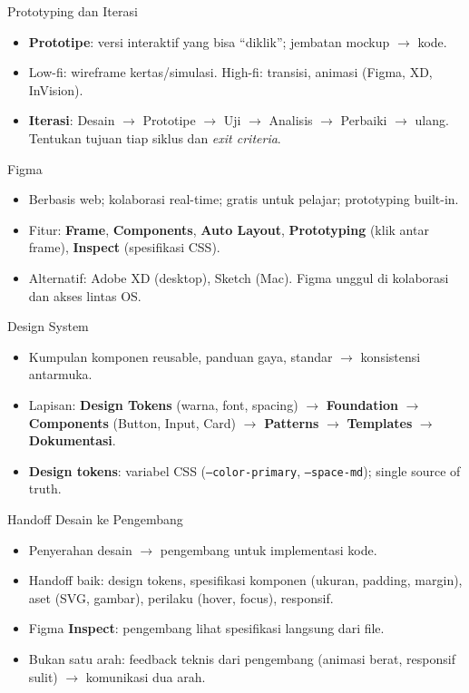 \documentclass[handout]{beamer}
\begin{document}
\begin{frame}{Prototyping dan Iterasi}
	\begin{itemize}
		\item \textbf{Prototipe}: versi interaktif yang bisa ``diklik''; jembatan mockup $\to$ kode.
		\item Low-fi: wireframe kertas/simulasi. High-fi: transisi, animasi (Figma, XD, InVision).
		\item \textbf{Iterasi}: Desain $\to$ Prototipe $\to$ Uji $\to$ Analisis $\to$ Perbaiki $\to$ ulang. Tentukan tujuan tiap siklus dan \textit{exit criteria}.
	\end{itemize}
\end{frame}

\begin{frame}{Figma}
	\begin{itemize}
		\item Berbasis web; kolaborasi real-time; gratis untuk pelajar; prototyping built-in.
		\item Fitur: \textbf{Frame}, \textbf{Components}, \textbf{Auto Layout}, \textbf{Prototyping} (klik antar frame), \textbf{Inspect} (spesifikasi CSS).
		\item Alternatif: Adobe XD (desktop), Sketch (Mac). Figma unggul di kolaborasi dan akses lintas OS.
	\end{itemize}
\end{frame}

\begin{frame}{Design System}
	\begin{itemize}
		\item Kumpulan komponen reusable, panduan gaya, standar $\to$ konsistensi antarmuka.
		\item Lapisan: \textbf{Design Tokens} (warna, font, spacing) $\to$ \textbf{Foundation} $\to$ \textbf{Components} (Button, Input, Card) $\to$ \textbf{Patterns} $\to$ \textbf{Templates} $\to$ \textbf{Dokumentasi}.
		\item \textbf{Design tokens}: variabel CSS (\texttt{--color-primary}, \texttt{--space-md}); single source of truth.
	\end{itemize}
\end{frame}

\begin{frame}{Handoff Desain ke Pengembang}
	\begin{itemize}
		\item Penyerahan desain $\to$ pengembang untuk implementasi kode.
		\item Handoff baik: design tokens, spesifikasi komponen (ukuran, padding, margin), aset (SVG, gambar), perilaku (hover, focus), responsif.
		\item Figma \textbf{Inspect}: pengembang lihat spesifikasi langsung dari file.
		\item Bukan satu arah: feedback teknis dari pengembang (animasi berat, responsif sulit) $\to$ komunikasi dua arah.
	\end{itemize}
\end{frame}
\end{document}
